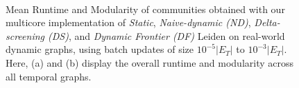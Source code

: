 \begin{figure}[!hbt]
{  } \\[-2ex]
  \caption{Mean Runtime and Modularity of communities obtained with our multicore implementation of \textit{Static}, \textit{Naive-dynamic (ND)}, \textit{Delta-screening (DS)}, and \textit{Dynamic Frontier (DF)} Leiden on real-world dynamic graphs, using batch updates of size $10^{-5}|E_T|$ to $10^{-3}|E_T|$. Here, (a) and (b) display the overall runtime and modularity across all temporal graphs.}
  \label{fig:aggregation-adjust-chunksize}
\end{figure}
